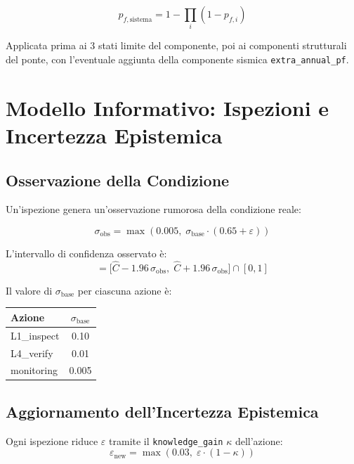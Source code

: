 \documentclass[11pt,a4paper]{article}
\begin{document}
\begin{equation}
  p_{f,\text{sistema}} = 1 - \prod_i (1 - p_{f,i})
\end{equation}

Applicata prima ai 3 stati limite del componente, poi ai componenti strutturali del ponte, con l'eventuale aggiunta della componente sismica \texttt{extra\_annual\_pf}.

\section{Modello Informativo: Ispezioni e Incertezza Epistemica}

\subsection{Osservazione della Condizione}

Un'ispezione genera un'osservazione rumorosa della condizione reale:

\begin{equation}
  \sigma_{\text{obs}} = \max(0.005,\; \sigma_{\text{base}} \cdot (0.65 + \varepsilon))
\end{equation}

L'intervallo di confidenza osservato \`e:
\begin{equation}
  [C_{\text{obs,min}},\; C_{\text{obs,max}}] = \bigl[\hat{C} - 1.96\,\sigma_{\text{obs}},\; \hat{C} + 1.96\,\sigma_{\text{obs}}\bigr] \cap [0,1]
\end{equation}

Il valore di $\sigma_{\text{base}}$ per ciascuna azione \`e:

\begin{center}
\begin{tabular}{lc}
\toprule
\textbf{Azione} & $\sigma_{\text{base}}$ \\
\midrule
L1\_inspect & 0.10 \\
L4\_verify  & 0.01 \\
monitoring  & 0.005 \\
\bottomrule
\end{tabular}
\end{center}

\subsection{Aggiornamento dell'Incertezza Epistemica}

Ogni ispezione riduce $\varepsilon$ tramite il \texttt{knowledge\_gain} $\kappa$ dell'azione:
\begin{equation}
  \varepsilon_{\text{new}} = \max(0.03,\; \varepsilon \cdot (1 - \kappa))
\end{equation}
\end{document}

